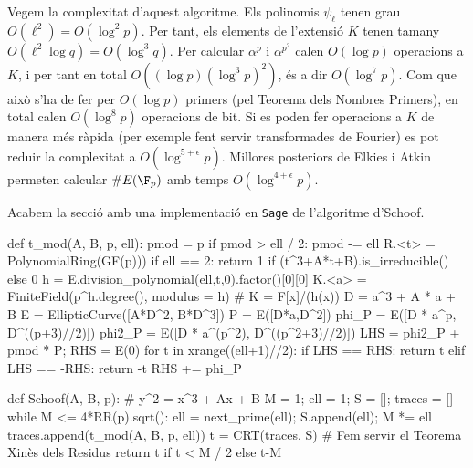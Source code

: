 Vegem la complexitat d'aquest algoritme. Els polinomis $\psi_\ell$ tenen grau $O(\ell^2)=O(\log^2 p)$. Per tant, els elements de l'extensió $K$ tenen tamany $O(\ell^2\log q)=O(\log^3 q)$. Per calcular $\alpha^p$ i $\alpha^{p^2}$ calen $O(\log p)$ operacions a $K$, i per tant en total $O((\log p)(\log^3 p)^2)$, és a dir $O(\log^7 p)$. Com que això s'ha de fer per $O(\log p)$ primers (pel Teorema dels Nombres Primers), en total calen $O(\log^8 p)$ operacions de bit. Si es poden fer operacions a $K$ de manera més ràpida (per exemple fent servir transformades de Fourier) es pot reduir la complexitat a $O(\log^{5+\epsilon} p)$. Millores posteriors de Elkies i Atkin permeten calcular $\#E(\F_p)$ amb temps $O(\log^{4+\epsilon} p)$.

Acabem la secció amb una implementació en  \texttt{Sage} de l'algoritme d'Schoof.

\begin{python}    
def t_mod(A, B, p, ell):
    pmod = p %
    if pmod > ell / 2: pmod -= ell
    R.<t> = PolynomialRing(GF(p)))
    if ell == 2: return 1 if (t^3+A*t+B).is_irreducible() else 0
    h = E.division_polynomial(ell,t,0).factor()[0][0]
    K.<a> = FiniteField(p^h.degree(), modulus = h)    # K = F[x]/(h(x))
    D = a^3 + A * a + B
    E = EllipticCurve([A*D^2, B*D^3])
    P = E([D*a,D^2])
    phi_P = E([D * a^p, D^((p+3)//2)])
    phi2_P = E([D * a^(p^2), D^((p^2+3)//2)])
    LHS = phi2_P + pmod * P; RHS = E(0)
    for t in xrange((ell+1)//2):
        if LHS ==  RHS: return t
        elif LHS == -RHS: return -t
        RHS += phi_P
\end{python}
\begin{python}
def Schoof(A, B, p): # y^2 = x^3 + Ax + B 
    M = 1; ell = 1; S = []; traces = []
    while M <= 4*RR(p).sqrt():
        ell = next_prime(ell); S.append(ell); M *= ell
        traces.append(t_mod(A, B, p, ell))      
    t = CRT(traces, S) # Fem servir el Teorema Xinès dels Residus
    return t if t < M / 2 else t-M
\end{python}